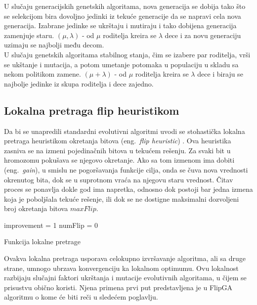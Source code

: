 \documentclass[a4paper]{article}
\begin{document}
U slučaju generacijskih genetskih algoritama, nova generacija se dobija tako što se 
selekcijom bira dovoljno jedinki iz tekuće generacije da se napravi cela nova generacija.
Izabrane jedinke se ukrštaju i mutiraju i tako dobijena generacija zamenjuje staru.
$(\mu, \lambda)$ - od $\mu$ roditelja kreira se $\lambda$ dece i 
za novu generaciju uzimaju se najbolji među decom.\\ 
 
U slučaju genetskih algoritama stabilnog stanja, čim se izabere par roditelja, 
vrši se ukštanje i mutacija, a potom umetanje potomaka u populaciju u 
skladu sa nekom politikom zamene. $(\mu + \lambda)$ - od $\mu$ roditelja 
kreira se $\lambda$ dece i biraju se najbolje jedinke iz skupa roditelja i dece zajedno. 


\subsection{Lokalna pretraga flip heuristikom}
\label{sec:lokalna_pretraga_flip}
Da bi se unapredili standardni evolutivni algoritmi uvodi se stohastička lokalna pretraga
heuristikom okretanja bitova (eng.~{\em flip heuristic}) \cite{MaRos99_flipGA}.
Ova heuristika zasniva se na izmeni pojedinačnih bitova u tekućem rešenju. 
Za svaki bit u hromozomu pokušava se njegovo okretanje. Ako sa tom izmenom ima dobiti 
(eng.~{\em gain}), u smislu ne pogoršavanja funkcije cilja, 
onda se čuva nova vrednosti okrenutog bita, 
dok se u suprotnom vraća na njegovu staru vrednost. 
Čitav proces se ponavlja dokle god ima napretka, odnosno dok postoji bar jedna izmena
koja je poboljšala tekuće rešenje, ili dok se ne dostigne maksimalni dozvoljeni broj
okretanja bitova $maxFlip$.\\

\begin{algorithm}[H]
\SetAlgoLined
{}

\BlankLine
 improvement = 1\;
 numFlip = 0\;
 \caption{Funkcija lokalne pretrage}
\end{algorithm}

Ovakva lokalna pretraga usporava celokupno izvršavanje algoritma, ali sa druge strane, 
umnogo ubrzava konvergenciju ka lokalnom optimumu. Ovu lokalnost razbijaju slučajni faktori
ukrštanja i mutacije evolutivnih algoritama, u čijem se prisustvu obično koristi. 
Njena primena prvi put predstavljena je u FlipGA algoritmu o kome će biti reči 
u sledećem poglavlju.
\end{document}
